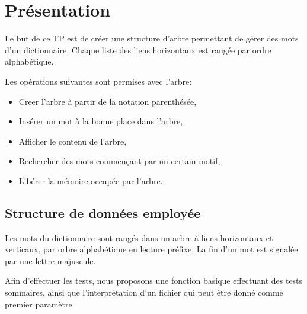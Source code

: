 \documentclass{report}
\begin{document}
  
  \tableofcontents
  \setlength{\parskip}{10pt}
  \setlength{\parindent}{0pt}
  \chapter{Présentation}
    Le but de ce TP est de créer une structure d'arbre permettant de gérer des mots d'un dictionnaire. Chaque liste des liens horizontaux est rangée par ordre alphabétique.

    Les opérations suivantes sont permises avec l'arbre:
    \begin{itemize}
      \item Creer l'arbre à partir de la notation parenthésée,
      \item Insérer un mot à la bonne place dans l'arbre,
      \item Afficher le contenu de l'arbre,
      \item Rechercher des mots commençant par un certain motif,
      \item Libérer la mémoire occupée par l'arbre.
    \end{itemize}

    \section{Structure de données employée}
      Les mots du dictionnaire sont rangés dans un arbre à liens horizontaux et verticaux, par orbre alphabétique en lecture préfixe. La fin d'un mot est signalée par une lettre majuscule.

      

      Afin d'effectuer les tests, nous proposons une fonction basique effectuant des tests sommaires, ainsi que l'interprétation d'un fichier qui peut être donné comme premier paramètre.
\end{document}
